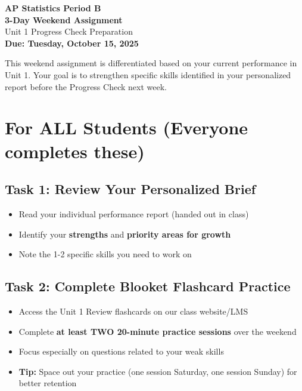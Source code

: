 \documentclass[12pt]{article}
\begin{document}
\begin{center}
{\LARGE \textbf{AP Statistics Period B}}\\[0.1in]
{\Large \textbf{3-Day Weekend Assignment}}\\[0.05in]
{\large Unit 1 Progress Check Preparation}\\[0.05in]
\textbf{Due: Tuesday, October 15, 2025}
\end{center}

\vspace{0.2in}

\begin{tcolorbox}[colback=green!5!white,colframe=green!75!black,title=\textbf{Overview}]
This weekend assignment is differentiated based on your current performance in Unit 1. Your goal is to strengthen specific skills identified in your personalized report before the Progress Check next week.
\end{tcolorbox}

\vspace{0.15in}

\section*{For ALL Students (Everyone completes these)}

\subsection*{Task 1: Review Your Personalized Brief}

\begin{itemize}[leftmargin=*]
    \item Read your individual performance report (handed out in class)
    \item Identify your \textbf{strengths} and \textbf{priority areas for growth}
    \item Note the 1-2 specific skills you need to work on
\end{itemize}

\subsection*{Task 2: Complete Blooket Flashcard Practice}

\begin{itemize}[leftmargin=*]
    \item Access the Unit 1 Review flashcards on our class website/LMS
    \item Complete \textbf{at least TWO 20-minute practice sessions} over the weekend
    \item Focus especially on questions related to your weak skills
    \item \textbf{Tip:} Space out your practice (one session Saturday, one session Sunday) for better retention
\end{itemize}
\end{document}
